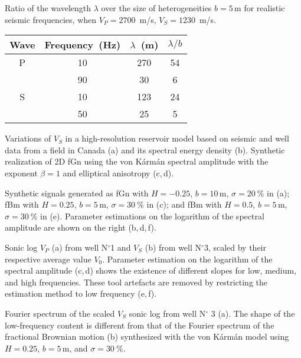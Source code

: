 {Ratio of the wavelength $\lambda$ over the size of heterogeneities $b=5$\,m for realistic seismic frequencies,
when $V_P=2700$~m/s, $V_S=1230$~m/s.}
{
\begin{center}
\begin{tabular}{|c|c|c|c|}
\hline
Wave & Frequency~(Hz) & $\lambda$~(m) & $\lambda/b$ \\
\hline
P & 10  & 270 & 54 \\
  & 90  & 30  &  6 \\ \hline
S & 10  & 123 & 24 \\
  & 50  & 25  &  5 \\
\hline
\end{tabular}
\end{center}
}





{Variations of $V_S$ in a high-resolution reservoir model based 
on seismic and well data from a field in Canada
(a) and its spectral energy density (b).
Synthetic realization of 2D fGn
using the von K\'arm\'an spectral amplitude with the exponent $\beta=1$ 
and elliptical anisotropy (c,\,d).}

{Synthetic signals generated as fGn with $H=-0.25$, $b=10$\,m, $\sigma=20~\%$ in (a); 
fBm with $H=0.25$, $b=5$\,m, $\sigma=30~\%$ in (c); and fBm with $H=0.5$, $b=5$\,m, $\sigma=30~\%$ in (e).
Parameter estimations on the logarithm of the spectral amplitude are shown on the right (b,\,d,\,f).}

{Sonic log $V_P$ (a) from well N$^{\circ}$1 and $V_S$ (b) from well N$^{\circ}$3, scaled by their respective average value $V_0$.
Parameter estimation on the logarithm of the spectral amplitude (c,\,d) shows the existence of different slopes 
for low, medium, and high frequencies.
These tool artefacts are removed by restricting the estimation method to low frequency (e,\,f).}

{Fourier spectrum of the scaled $V_S$ sonic log from well N$^{\circ}$ 3 (a). The shape of the low-frequency 
content is different from that of the Fourier spectrum of the fractional Brownian motion (b)
synthesized with the von K\'arm\'an model using $H=0.25$, $b=5$\,m, and $\sigma=30~\%$.}

